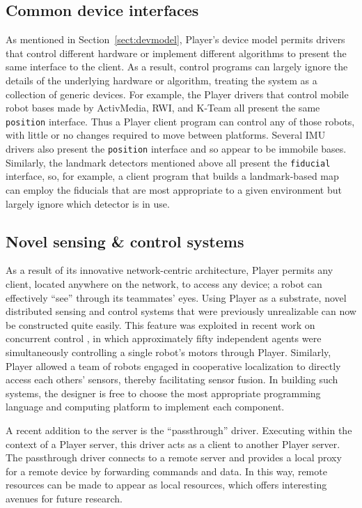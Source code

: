 \documentclass[a4paper]{ICAR2003}
\begin{document}
\subsection{Common device interfaces}
As mentioned in Section~\ref{sect:devmodel}, Player's device model
permits drivers that control different hardware or implement different
algorithms to present the same interface to the client.  As a result,
control programs can largely ignore the details of the underlying
hardware or algorithm, treating the system as a collection of generic
devices.  For example, the Player drivers that control mobile robot
bases made by ActivMedia, RWI, and K-Team all present the same {\tt
  position} interface.  Thus a Player client program can control any
of those robots, with little or no changes required to move between
platforms.  Several IMU drivers also present the {\tt position}
interface and so appear to be immobile bases.  Similarly, the landmark
detectors mentioned above all present the {\tt fiducial} interface,
so, for example, a client program that builds a landmark-based map can
employ the fiducials that are most appropriate to a given environment
but largely ignore which detector is in use.

\subsection{Novel sensing \& control systems}
As a result of its innovative network-centric architecture, Player
permits any client, located anywhere on the network, to access any
device; a robot can effectively ``see'' through its teammates' eyes.
Using Player as a substrate, novel distributed sensing and control
systems that were previously unrealizable can now be constructed quite
easily.  This feature was exploited in recent work on concurrent control
\cite{GerkeyMataricSukhatme02}, in which approximately fifty independent
agents were simultaneously controlling a single robot's motors through
Player.  Similarly, Player allowed a team of robots engaged in cooperative
localization \cite{HowardMataricSukhatme03} to directly access each
others' sensors, thereby facilitating sensor fusion.  In building such
systems, the designer is free to choose the most appropriate programming
language and computing platform to implement each component.

A recent addition to the server is the ``passthrough'' driver.
Executing within the context of a Player server, this driver acts as a
client to another Player server.  The passthrough driver connects to a
remote server and provides a local proxy for a remote device by forwarding
commands and data.  In this way, remote resources can be made to appear as
local resources, which offers interesting avenues for future research.
\end{document}
